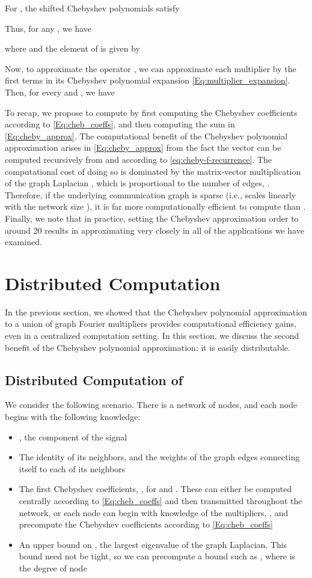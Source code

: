 \documentclass[conference]{IEEEtran}
\begin{document}
For , the shifted Chebyshev polynomials
satisfy

Thus, for any , we have

where  and the  element of  is given by


Now, to approximate the operator , we can approximate each multiplier  by the first  terms in its Chebyshev polynomial expansion \eqref{Eq:multiplier_expansion}.
Then,
for every  and , we have



To recap, we propose to compute  by first computing the Chebyshev coefficients  according to \eqref{Eq:cheb_coeffs}, and then computing the sum in \eqref{Eq:cheby_approx}. The computational benefit of the Chebyshev polynomial approximation arises in \eqref{Eq:cheby_approx}
from the fact the vector  can be computed recursively from  and  according to \eqref{eq:cheby-f-recurrence}.
The computational cost of doing so is dominated by the matrix-vector multiplication of the graph Laplacian , which is proportional to the number of edges,  \cite{LTS-ARTICLE-2009-053}. Therefore, if the underlying communication graph is sparse (i.e.,  scales linearly with the network size ), it is far more computationally efficient to compute  than . Finally, we note that in practice, setting the Chebyshev approximation order  to around 20 results in  approximating  very closely in all of the applications we have examined.

\section{Distributed Computation} \label{Se:distribution}
In the previous section, we showed that the Chebyshev polynomial approximation to a union of graph Fourier multipliers provides computational efficiency gains, even in a centralized computation setting. In this section, we discuss the second benefit of the Chebyshev polynomial approximation: it is easily distributable.


\subsection{Distributed Computation of } \label{Se:forward}
We consider the following scenario. There is a network of  nodes, and each node  begins with the following knowledge:
\begin{itemize}
\item , the  component of the signal 
\item The identity of its neighbors, and the weights of the graph edges connecting itself to each of its neighbors
\item The first  Chebyshev coefficients, , for  and . These can either be computed centrally according to \eqref{Eq:cheb_coeffs} and then transmitted throughout the network, or each node can begin with knowledge of the
multipliers, , and precompute the Chebyshev coefficients according to \eqref{Eq:cheb_coeffs}
\item An upper bound on , the largest eigenvalue of the graph Laplacian. This bound need not be tight, so we can precompute a bound such as , where  is the degree of node  \cite{anderson_morley} \end{itemize}
\end{document}
